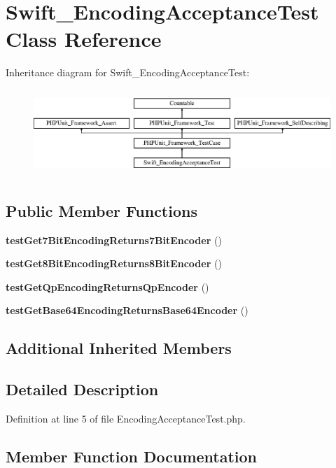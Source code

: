 \section{Swift\+\_\+\+Encoding\+Acceptance\+Test Class Reference}
\label{class_swift___encoding_acceptance_test}
Inheritance diagram for Swift\+\_\+\+Encoding\+Acceptance\+Test\+:\begin{figure}[H]
\begin{center}
\leavevmode
\includegraphics[height=3.303835cm]{class_swift___encoding_acceptance_test}
\end{center}
\end{figure}
\subsection*{Public Member Functions}
\begin{DoxyCompactItemize}
\item 
{\bf test\+Get7\+Bit\+Encoding\+Returns7\+Bit\+Encoder} ()
\item 
{\bf test\+Get8\+Bit\+Encoding\+Returns8\+Bit\+Encoder} ()
\item 
{\bf test\+Get\+Qp\+Encoding\+Returns\+Qp\+Encoder} ()
\item 
{\bf test\+Get\+Base64\+Encoding\+Returns\+Base64\+Encoder} ()
\end{DoxyCompactItemize}
\subsection*{Additional Inherited Members}


\subsection{Detailed Description}


Definition at line 5 of file Encoding\+Acceptance\+Test.\+php.



\subsection{Member Function Documentation}

